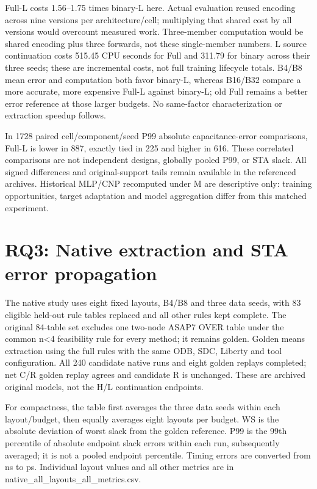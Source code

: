 \documentclass[10pt,twocolumn]{article}
\begin{document}
Full-L costs 1.56--1.75 times binary-L here. Actual evaluation reused encoding across nine versions per architecture/cell; multiplying that shared cost by all versions would overcount measured work. Three-member computation would be shared encoding plus three forwards, not these single-member numbers. L source continuation costs 515.45 CPU seconds for Full and 311.79 for binary across their three seeds; these are incremental costs, not full training lifecycle totals. B4/B8 mean error and computation both favor binary-L, whereas B16/B32 compare a more accurate, more expensive Full-L against binary-L; old Full remains a better error reference at those larger budgets. No same-factor characterization or extraction speedup follows.

In 1728 paired cell/component/seed P99 absolute capacitance-error comparisons, Full-L is lower in 887, exactly tied in 225 and higher in 616. These correlated comparisons are not independent designs, globally pooled P99, or STA slack. All signed differences and original-support tails remain available in the referenced archives. Historical MLP/CNP recomputed under M are descriptive only: training opportunities, target adaptation and model aggregation differ from this matched experiment.

\section*{RQ3: Native extraction and STA error propagation}

The native study uses eight fixed layouts, B4/B8 and three data seeds, with 83 eligible held-out rule tables replaced and all other rules kept complete. The original 84-table set excludes one two-node ASAP7 OVER table under the common n<4 feasibility rule for every method; it remains golden. Golden means extraction using the full rules with the same ODB, SDC, Liberty and tool configuration. All 240 candidate native runs and eight golden replays completed; net C/R golden replay agrees and candidate R is unchanged. These are archived original models, not the H/L continuation endpoints.

For compactness, the table first averages the three data seeds within each layout/budget, then equally averages eight layouts per budget. WS is the absolute deviation of worst slack from the golden reference. P99 is the 99th percentile of absolute endpoint slack errors within each run, subsequently averaged; it is not a pooled endpoint percentile. Timing errors are converted from ns to ps. Individual layout values and all other metrics are in native\_all\_layouts\_all\_metrics.csv.
\end{document}
